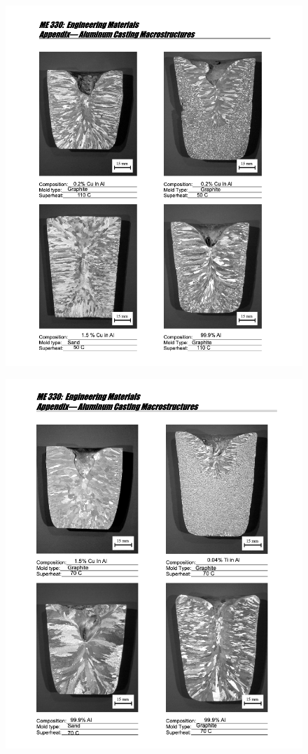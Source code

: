 \documentclass{article}
\begin{document}
\begin{figure}[!h!]
    \centering
    \includegraphics[width=\linewidth]{Lab4/ws_p1.png}
\end{figure}
\newpage
\begin{figure}[!h!]
    \centering
    \includegraphics[width=\linewidth]{Lab4/ws_p2.png}
\end{figure}
\end{document}
